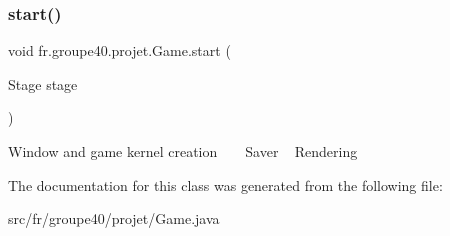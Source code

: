 \subsubsection{\texorpdfstring{start()}{start()}}
{\footnotesize\ttfamily void fr.\+groupe40.\+projet.\+Game.\+start (\begin{DoxyParamCaption}\item[{Stage}]{stage }\end{DoxyParamCaption})}

Window and game kernel creation ~\newline
~\newline
 Saver ~\newline
 Rendering 

The documentation for this class was generated from the following file\+:\begin{DoxyCompactItemize}
\item 
src/fr/groupe40/projet/Game.\+java\end{DoxyCompactItemize}
